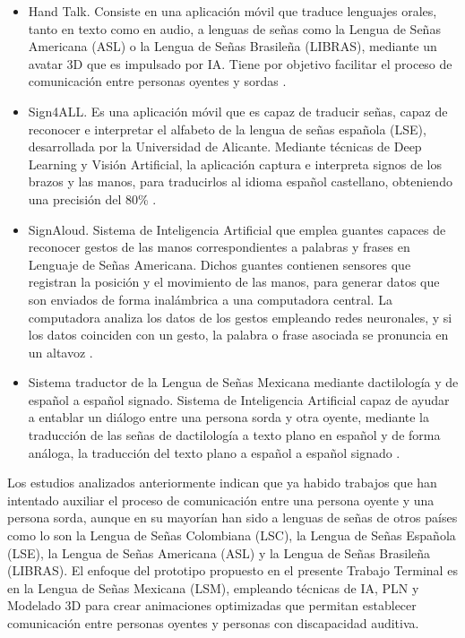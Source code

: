 \begin{itemize}
    \item Hand Talk. Consiste en una aplicación móvil que traduce lenguajes orales, tanto en texto como en audio, a lenguas de señas como la Lengua de Señas Americana (ASL) o la Lengua de Señas Brasileña (LIBRAS), mediante un avatar 3D que es impulsado por IA. Tiene por objetivo facilitar el proceso de comunicación entre personas oyentes y sordas \cite{ref12}. 
    \item Sign4ALL. Es una aplicación móvil que es capaz de traducir señas, capaz de reconocer e interpretar el alfabeto de la lengua de señas española (LSE), desarrollada por la Universidad de Alicante. Mediante técnicas de Deep Learning y Visión Artificial, la aplicación captura e interpreta signos de los brazos y las manos, para traducirlos al idioma español castellano, obteniendo una precisión del 80\% \cite{ref13}.
    \item SignAloud. Sistema de Inteligencia Artificial que emplea guantes capaces de reconocer gestos de las manos correspondientes a palabras y frases en Lenguaje de Señas Americana. Dichos guantes contienen sensores que registran la posición y el movimiento de las manos, para generar datos que son enviados de forma inalámbrica a una computadora central. La computadora analiza los datos de los gestos empleando redes neuronales, y si los datos coinciden con un gesto, la palabra o frase asociada se pronuncia en un altavoz \cite{ref14}.
    \item Sistema traductor de la Lengua de Señas Mexicana mediante dactilología y de español a español signado. Sistema de Inteligencia Artificial capaz de ayudar a entablar un diálogo entre una persona sorda y otra oyente, mediante la traducción de las señas de dactilología a texto plano en español y de forma análoga, la traducción del texto plano a español a español signado \cite{ref15}.
\end{itemize}

Los estudios analizados anteriormente indican que ya habido trabajos que han intentado auxiliar el proceso de comunicación entre una persona oyente y una persona sorda, aunque en su mayorían han sido a lenguas de señas de otros países como lo son la Lengua de Señas Colombiana (LSC), la Lengua de Señas Española (LSE), la Lengua de Señas Americana (ASL) y la Lengua de Señas Brasileña (LIBRAS). El enfoque del prototipo propuesto en el presente Trabajo Terminal es en la Lengua de Señas Mexicana (LSM), empleando técnicas de IA, PLN y Modelado 3D para crear animaciones optimizadas que permitan establecer comunicación entre personas oyentes y personas con discapacidad auditiva. \\

